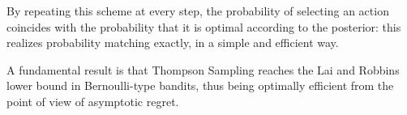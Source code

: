 By repeating this scheme at every step, the probability of selecting an action coincides with the probability that it is optimal according to the posterior: this realizes probability matching exactly, in a simple and efficient way.

A fundamental result is that Thompson Sampling reaches the Lai and Robbins lower bound in Bernoulli-type bandits, thus being optimally efficient from the point of view of asymptotic regret.

